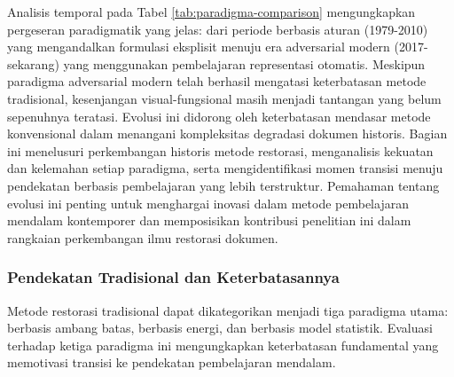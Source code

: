 Analisis temporal pada Tabel \ref{tab:paradigma-comparison} mengungkapkan pergeseran paradigmatik yang jelas: dari periode berbasis aturan (1979-2010) yang mengandalkan formulasi eksplisit menuju era adversarial modern (2017-sekarang) yang menggunakan pembelajaran representasi otomatis. Meskipun paradigma adversarial modern telah berhasil mengatasi keterbatasan metode tradisional, kesenjangan visual-fungsional masih menjadi tantangan yang belum sepenuhnya teratasi. Evolusi ini didorong oleh keterbatasan mendasar metode konvensional dalam menangani kompleksitas degradasi dokumen historis. Bagian ini menelusuri perkembangan historis metode restorasi, menganalisis kekuatan dan kelemahan setiap paradigma, serta mengidentifikasi momen transisi menuju pendekatan berbasis pembelajaran yang lebih terstruktur. Pemahaman tentang evolusi ini penting untuk menghargai inovasi dalam metode pembelajaran mendalam kontemporer dan memposisikan kontribusi penelitian ini dalam rangkaian perkembangan ilmu restorasi dokumen.

\subsubsection{Pendekatan Tradisional dan Keterbatasannya}
\label{subsubsec:pendekatan-tradisional}

% 

Metode restorasi tradisional dapat dikategorikan menjadi tiga paradigma utama: berbasis ambang batas, berbasis energi, dan berbasis model statistik. Evaluasi terhadap ketiga paradigma ini mengungkapkan keterbatasan fundamental yang memotivasi transisi ke pendekatan pembelajaran mendalam.

